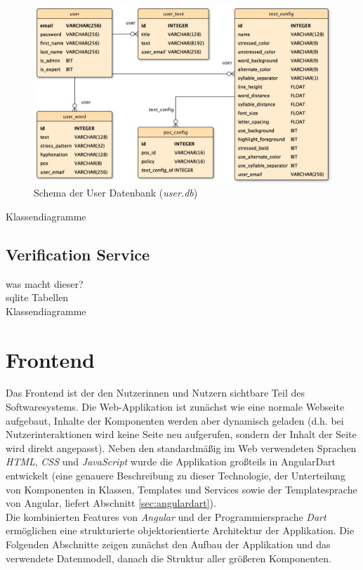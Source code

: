 \begin{figure}[h!]
	\centering
	\includegraphics[width=.8\linewidth]{figures/userservicedb}
	\caption{Schema der User Datenbank (\textit{user.db})}
	\label{fig:userdb}
\end{figure}

Klassendiagramme\\

\subsection{Verification Service}
was macht dieser?\\
sqlite Tabellen\\
Klassendiagramme\\






\section{Frontend}

Das Frontend ist der den Nutzerinnen und Nutzern sichtbare Teil des Softwaresystems. Die Web-Applikation ist zunächst wie eine normale Webseite aufgebaut, Inhalte der Komponenten werden aber dynamisch geladen (d.h. bei Nutzerinteraktionen wird keine Seite neu aufgerufen, sondern der Inhalt der Seite wird direkt angepasst). Neben den standardmäßig im Web verwendeten Sprachen \textit{HTML}, \textit{CSS} und \textit{JavaScript} wurde die Applikation großteils in AngularDart entwickelt (eine genauere Beschreibung zu dieser Technologie, der Unterteilung von Komponenten in Klassen, Templates und Services sowie der Templatesprache von Angular, liefert Abschnitt \ref{sec:angulardart}).\\

Die kombinierten Features von \textit{Angular} und der Programmiersprache \textit{Dart} ermöglichen eine strukturierte objektorientierte Architektur der Applikation. Die Folgenden Abschnitte zeigen zunächst den Aufbau der Applikation und das verwendete Datenmodell, danach die Struktur aller größeren Komponenten.

